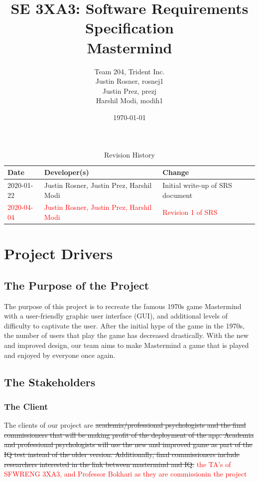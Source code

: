 \documentclass[12pt, titlepage]{article}
\title{SE 3XA3: Software Requirements Specification\\Mastermind}
\author{Team 204, Trident Inc.
		\\ Justin Rosner, rosnej1 
		\\ Justin Prez, prezj
		\\ Harshil Modi, modih1
}
\date{\today}
\begin{document}
\maketitle

\tableofcontents
\listoftables
\listoffigures

\begin{table}[hp]
\caption{Revision History} \label{TblRevisionHistory}
\begin{tabularx}{\textwidth}{llX}
\toprule
\textbf{Date} & \textbf{Developer(s)} & \textbf{Change}\\
\midrule
2020-01-22 & Justin Rosner, Justin Prez, Harshil Modi & Initial write-up of SRS document\\
\textcolor{red}{2020-04-04} & \textcolor{red}{Justin Rosner, Justin Prez, Harshil Modi} & \textcolor{red}{Revision 1 of SRS}\\
\bottomrule
\end{tabularx}
\end{table}


\newpage


\section{Project Drivers}

\subsection{The Purpose of the Project}
The purpose of this project is to recreate the famous 1970s game Mastermind with a user-friendly graphic user interface (GUI), and additional levels of difficulty to captivate the user. After the initial hype of the game in the 1970s, the number of users that play the game has decreased drastically. With the new and improved design, our team aims to make Mastermind a game that is played and enjoyed by everyone once again.

\subsection{The Stakeholders}

\subsubsection{The Client}
The clients of our project are \sout{academia/professional psychologists and the final commissioners that will be making profit of the deployment of the app. Academia and professional psychologists will use the new and improved game as part of the IQ test instead of the older version. Additionally, final commissioners include researchers interested in the link between mastermind and IQ.} \textcolor{red}{the TA's of SFWRENG 3XA3, and Professor Bokhari as they are commissionin the project}
\end{document}
